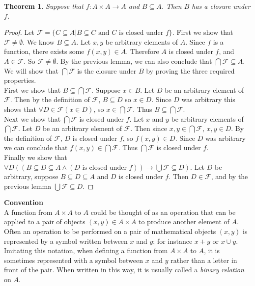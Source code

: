 \documentclass{report}
\newtheorem*{theorem}{Theorem}
\theoremstyle{definition}
\begin{document}
\begin{theorem}
Suppose that $f:A\times A\to A$ and $B\subseteq A$. Then $B$ has a closure under $f$.
\end{theorem}
\begin{proof}
Let $\mathcal F=\{C\subseteq A|B\subseteq C\text{ and $C$ is closed under $f$}\}$. First we show that $\mathcal F\neq\emptyset$. We know $B\subseteq A$. Let $x,y$ be arbitrary elements of $A$. 
Since $f$ is a function, there exists some $f(x,y)\in A$. Therefore $A$ is closed under $f$, and $A\in\mathcal F$. So $\mathcal F\neq\emptyset$. By the previous lemma, we can also conclude that
$\bigcap\mathcal F\subseteq A$. We will show that $\bigcap\mathcal F$ is the closure under $B$ by proving the three required properties.\\
\indent First we show that $B\subseteq\bigcap\mathcal F$. Suppose $x\in B$. Let $D$ be an arbitrary element of $\mathcal F$. Then by the definition of $\mathcal F$, $B\subseteq D$ so $x\in D$.
Since $D$ was arbitrary this shows that $\forall D\in\mathcal F(x\in D)$, so $x\in\bigcap\mathcal F$. Thus $B\subseteq\bigcap\mathcal F$.\\
\indent Next we show that $\bigcap\mathcal F$ is closed under $f$. Let $x$ and $y$ be arbitrary elements of $\bigcap\mathcal F$. Let $D$ be an arbitrary element of $\mathcal F$. Then since
$x,y\in\bigcap\mathcal F$, $x,y\in D$. By the definition of $\mathcal F$, $D$ is closed under $f$, so $f(x,y)\in D$. Since $D$ was arbitrary we can conclude that $f(x,y)\in\bigcap\mathcal F$. 
Thus $\bigcap\mathcal F$ is closed under $f$.\\
\indent Finally we show that $\forall D((B\subseteq D\subseteq A\land(\text{$D$ is closed under $f$}))\to\bigcup\mathcal F\subseteq D)$. Let $D$ be arbitrary, suppose $B\subseteq D\subseteq A$ and
$D$ is closed under $f$. Then $D\in\mathcal F$, and by the previous lemma $\bigcup\mathcal F\subseteq D$.
\end{proof}\newpage
\noindent\textbf{Convention}\\ 
A function from $A\times A$ to $A$ could be thought of as an operation that can be applied to a pair of objects $(x,y)\in A\times A$ to produce another element of $A$. Often an operation 
to be performed on a pair of mathematical objects $(x,y)$ is represented by a symbol written between $x$ and $y$; for instance $x+y$ or $x\cup y$. Imitating this notation, when defining a function
from $A\times A$ to $A$, it is sometimes represented with a symbol between $x$ and $y$ rather than a letter in front of the pair. When written in this way, it is usually called a \textit{binary
relation} on $A$.
\newpage
\end{document}
